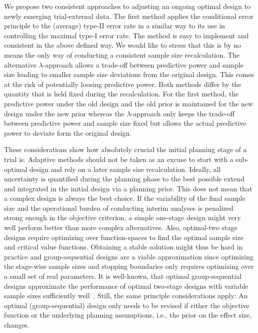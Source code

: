 \documentclass{article}
\begin{document}
We propose two consistent approaches to adjusting an ongoing optimal design to 
newly emerging trial-external data.
The first method applies the conditional error principle to the (average) type-II error rate in a 
similar way to its use in controlling the maximal type-I error rate.
The method is easy to implement and consistent in the above defined way.
We would like to stress that this is by no means the only way of 
conducting a consistent sample size recalculation.
The alternative $\lambda$-approach allows a trade-off between predictive power 
and sample size leading to smaller sample size deviations from the original design.
This comes at the risk of potentially loosing predictive power.
Both methods differ by the quantity that is held fixed during the recalculation.
For the first method, the predictive power under the old design and the old prior
is maintained for the new design under the new prior whereas the $\lambda$-approach
only keeps the trade-off between predictive power and sample size fixed but allows the
actual predictive power to deviate form the original design. 

These considerations show how absolutely crucial the initial planning stage of a trial is. 
Adaptive methods should not be taken as an excuse to start with a
sub-optimal design and rely on a later sample size recalculation.
Ideally, all uncertainty is quantified during the planning phase to 
the best possible extend and integrated in the initial design via a 
planning prior.
This does not mean that a complex design is always the best choice.
If the variability of the final sample size and the operational 
burden of conducting interim analyses is penalized strong enough in
the objective criterion, a simple one-stage design might very well
perform better than more complex alternatives.
Also, 
optimal-two stage designs require optimizing over function-spaces to find the optimal sample size and critical value functions.
Obtaining a stable solution might thus be hard in practice and
group-sequential designs are a viable approximation since optimizing the stage-wise sample sizes and stopping boundaries only requires optimizing over a small set of real parameters.
It is well-known, that optimal group-sequential designs approximate the performance of optimal two-stage designs with variable sample sizes sufficiently well~\citep{wassmer2016}.
Still, the same principle considerations apply: 
An optimal (group-sequential) design only needs to be revised if either the objective function or the underlying planning assumptions, i.e., the prior on the effect size, changes. 
\end{document}
